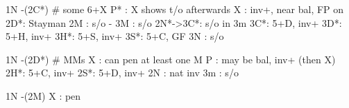 1N -(2C*) # some 6+X
P* : X shows t/o afterwards
X  : inv+, near bal, FP on
2D*: Stayman
2M : s/o
   - 3M : s/o
2N*->3C*: s/o in 3m
3C*: 5+D, inv+
3D*: 5+H, inv+
3H*: 5+S, inv+
3S*: 5+C, GF
3N : s/o

1N -(2D*) # MMs
X  : can pen at least one M
P  : may be bal, inv+ (then X)
2H*: 5+C, inv+
2S*: 5+D, inv+
2N : nat inv
3m : s/o

1N -(2M)
X  : pen